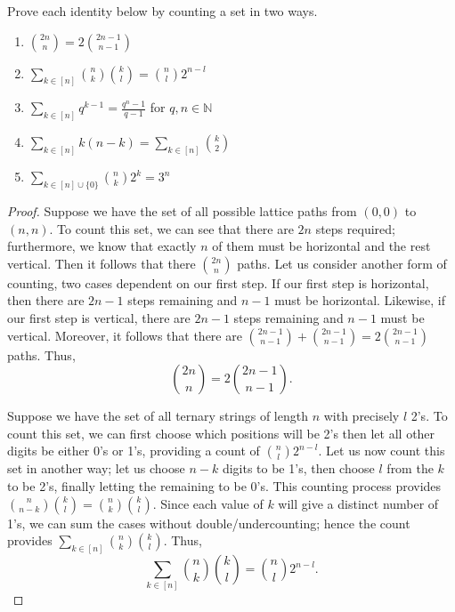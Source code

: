\documentclass[ 12pt ]{article}
\begin{document}
\begin{enumerate}
	\item[\textbf{3.}] Prove each identity below by counting a set in two ways.
		\begin{enumerate}
			\item[\textbf{i.}] $\binom{2n}{n} = 2\binom{2n-1}{n-1}$
			\item[\textbf{ii.}] $\sum_{k \in [n]} \binom{n}{k}\binom{k}{l} = \binom{n}{l} 2^{n-l}$
			\item[\textbf{iii.}] $\sum_{k \in [n]} q^{k-1} = \frac{q^n-1}{q-1}$ for $q, n \in \mathbb{N}$
			\item[\textbf{iv.}] $\sum_{k \in [n]} k(n-k) = \sum_{k \in [n]} \binom{k}{2}$
			\item[\textbf{v.}] $\sum_{k \in [n] \cup \{ 0 \}} \binom{n}{k} 2^k = 3^n$
		\end{enumerate}
		\newpage

		\begin{proof}
			\item[\textbf{i.}] Suppose we have the set of all possible lattice paths from $(0, 0)$ to $(n, n)$. To count this set, we can see that there are $2n$ steps required;
				furthermore, we know that exactly $n$ of them must be horizontal and the rest vertical. Then it follows that there $\binom{2n}{n}$ paths. Let us consider another
				form of counting, two cases dependent on our first step. If our first step is horizontal, then there are $2n-1$ steps remaining and $n-1$ must be horizontal.
				Likewise, if our first step is vertical, there are $2n-1$ steps remaining and $n-1$ must be vertical. Moreover, it follows that there are $\binom{2n-1}{n-1}
				+ \binom{2n-1}{n-1} = 2\binom{2n-1}{n-1}$ paths. Thus, $$\binom{2n}{n} = 2\binom{2n-1}{n-1}.$$

			\item[\textbf{ii.}] Suppose we have the set of all ternary strings of length $n$ with precisely $l$ 2's. To count this set, we can first choose which positions will be
				2's then let all other digits be either 0's or 1's, providing a count of $\binom{n}{l} 2^{n-l}$. Let us now count this set in another way; let us choose $n-k$
				digits to be 1's, then choose $l$ from the $k$ to be 2's, finally letting the remaining to be 0's. This counting process provides $\binom{n}{n-k}\binom{k}{l} =
				\binom{n}{k}\binom{k}{l}$. Since each value of $k$ will give a distinct number of 1's, we can sum the cases without double/undercounting; hence the count provides
				$\sum_{k \in [n]} \binom{n}{k}\binom{k}{l}$. Thus, $$\sum_{k \in [n]} \binom{n}{k}\binom{k}{l} = \binom{n}{l} 2^{n-l}.$$


\end{proof}
\end{enumerate}
\end{document}

